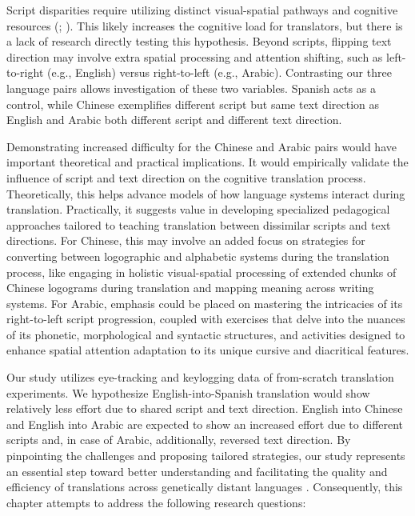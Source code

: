 \documentclass[output=paper]{langscibook}
\begin{document}
Script disparities require utilizing distinct visual-spatial pathways and cognitive resources (\citealt{KandhadaiFedermeier2010}; \citealt{PerfettiEtAl2007}). This likely increases the cognitive load for translators, but there is a lack of research directly testing this hypothesis. Beyond scripts, flipping text direction may involve extra spatial processing and attention shifting, such as left-to-right (e.g., English) versus right-to-left (e.g., Arabic). Contrasting our three language pairs allows investigation of these two variables. Spanish acts as a control, while Chinese exemplifies different script but same text direction as English and Arabic both different script and different text direction.

Demonstrating increased difficulty for the Chinese and Arabic pairs would have important theoretical and practical implications. It would empirically validate the influence of script and text direction on the cognitive translation process. Theoretically, this helps advance models of how language systems interact during translation. Practically, it suggests value in developing specialized pedagogical approaches tailored to teaching translation between dissimilar scripts and text directions. For Chinese, this may involve an added focus on strategies for converting between logographic and alphabetic systems during the translation process, like engaging in holistic visual-spatial processing of extended chunks of Chinese logograms during translation and mapping meaning across writing systems. For Arabic, emphasis could be placed on mastering the intricacies of its right-to-left script progression, coupled with exercises that delve into the nuances of its phonetic, morphological and syntactic structures, and activities designed to enhance spatial attention adaptation to its unique cursive and diacritical features.

Our study utilizes eye-tracking and keylogging data of from-scratch translation experiments. We hypothesize English-into-Spanish translation would show relatively less effort due to shared script and text direction. English into Chinese and English into Arabic are expected to show an increased effort due to different scripts and, in case of Arabic, additionally, reversed text direction. By pinpointing the challenges and proposing tailored strategies, our study represents an essential step toward better understanding and facilitating the quality and efficiency of translations across genetically distant languages \citep{Xiao2010}. Consequently, this chapter attempts to address the following research questions:
\end{document}
